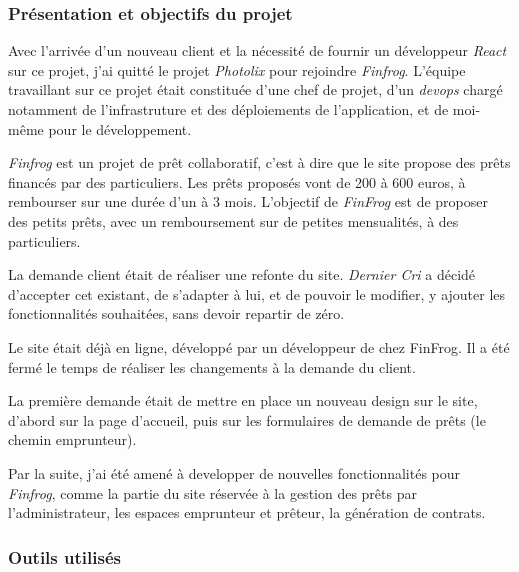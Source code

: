 \subsubsection{Présentation et objectifs du
projet}\label{pruxe9sentation-et-objectifs-du-projet-1}

\bigskip

Avec l'arrivée d'un nouveau client et la nécessité de fournir un
développeur \emph{React} sur ce projet, j'ai quitté le projet
\emph{Photolix} pour rejoindre \emph{Finfrog}. L'équipe travaillant sur
ce projet était constituée d'une chef de projet, d'un \emph{devops}
chargé notamment de l'infrastruture et des déploiements de
l'application, et de moi-même pour le développement.

\bigskip

\emph{Finfrog} est un projet de prêt collaboratif, c'est à dire que le
site propose des prêts financés par des particuliers. Les prêts proposés
vont de 200 à 600 euros, à rembourser sur une durée d'un à 3 mois.
L'objectif de \emph{FinFrog} est de proposer des petits prêts, avec un
remboursement sur de petites mensualités, à des particuliers.

\bigskip
La demande client était de réaliser une refonte du site. \emph{Dernier
Cri} a décidé d'accepter cet existant, de s'adapter à lui, et de pouvoir
le modifier, y ajouter les fonctionnalités souhaitées, sans devoir
repartir de zéro.

\bigskip

Le site était déjà en ligne, développé par un développeur de chez
FinFrog. Il a été fermé le temps de réaliser les changements à la
demande du client.

\bigskip

La première demande était de mettre en place un nouveau design sur le
site, d'abord sur la page d'accueil, puis sur les formulaires de demande
de prêts (le chemin emprunteur).

\bigskip

Par la suite, j'ai été amené à developper de nouvelles fonctionnalités
pour \emph{Finfrog}, comme la partie du site réservée à la gestion des
prêts par l'administrateur, les espaces emprunteur et prêteur, la
génération de contrats.

\bigskip

\subsubsection{Outils utilisés}\label{outils-utilisuxe9s-1}

